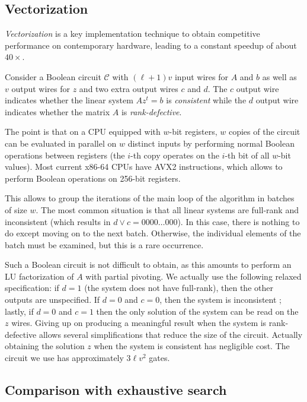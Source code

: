 \documentclass[a4paper,UKenglish,cleveref, autoref]{lipics-v2019}
\begin{document}
\subsection{Vectorization}

\emph{Vectorization} is a key implementation technique to obtain competitive
performance on contemporary hardware, leading to a constant speedup of about
$40 \times$.

Consider a Boolean circuit $\mathcal{C}$ with $(\ell+1)v$ input wires for $A$
and $b$ as well as $v$ output wires for $z$ and two extra output wires $c$ and
$d$. The $c$ output wire indicates whether the linear system $A z^t = b$ is
\emph{consistent} while the $d$ output wire indicates whether the matrix $A$ is
\emph{rank-defective}.

The point is that on a CPU equipped with $w$-bit registers, $w$ copies of the
circuit can be evaluated in parallel on $w$ distinct inputs by performing normal
Boolean operations between registers (the $i$-th copy operates on the $i$-th bit
of all $w$-bit values). Most current \textsf{x86-64} CPUs have \textsf{AVX2}
instructions, which allows to perform Boolean operations on 256-bit registers.

This allows to group the iterations of the main loop of the algorithm in batches
of size $w$. The most common situation is that all linear systems are full-rank
and inconsistent (which results in $d \vee c = 0000 \dots 000$). In this case,
there is nothing to do except moving on to the next batch. Otherwise, the
individual elements of the batch must be examined, but this is a rare occurrence.

Such a Boolean circuit is not difficult to obtain, as this amounts to perform an
LU factorization of $A$ with partial pivoting.  We actually use the following
relaxed specification: if $d=1$ (the system does not have full-rank), then the
other outputs are unspecified. If $d=0$ and $c=0$, then the system is
inconsistent ; lastly, if $d=0$ and $c=1$ then the only solution of the system
can be read on the $z$ wires. Giving up on producing a meaningful result when
the system is rank-defective allows several simplifications that reduce the size
of the circuit. Actually obtaining the solution $z$ when the system is
consistent has negligible cost. The circuit we use has approximately $3\ell v^2$
gates.

\subsection{Comparison with exhaustive search}
\end{document}
